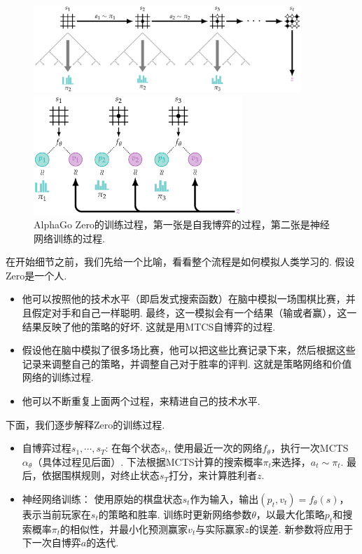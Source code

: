 \begin{figure}[ht]
\centering
\includegraphics[width=0.9\textwidth]{figures/game/self-play.pdf}
\vspace{1.5em}

\includegraphics[width=0.7\textwidth]{figures/game/network-training.pdf}
\caption{AlphaGo Zero的训练过程，第一张是自我博弈的过程，第二张是神经网络训练的过程. }
\label{fig:alphago-zero}
\end{figure}

在开始细节之前，我们先给一个比喻，看看整个流程是如何模拟人类学习的. 假设Zero是一个人. 
\begin{itemize}
    \item 他可以按照他的技术水平（即启发式搜索函数）在脑中模拟一场围棋比赛，并且假定对手和自己一样聪明. 最终，这一模拟会有一个结果（输或者赢），这一结果反映了他的策略的好坏. 这就是用MTCS自博弈的过程.
    \item 假设他在脑中模拟了很多场比赛，他可以把这些比赛记录下来，然后根据这些记录来调整自己的策略，并调整自己对于胜率的评判. 这就是策略网络和价值网络的训练过程.
    \item 他可以不断重复上面两个过程，来精进自己的技术水平. 
\end{itemize}

下面，我们逐步解释Zero的训练过程.

\begin{itemize}
    \item 自博弈过程$s_1,\cdots,s_T$: 在每个状态$s_t$, 使用最近一次的网络$f_\theta$，执行一次MCTS $\alpha_\theta$（具体过程见后面）. 下法根据MCTS计算的搜索概率$\pi_t$来选择，$a_t\sim\pi_t$. 最后，依据围棋规则，对终止状态$s_T$打分，来计算胜利者$z$. 
    \item 神经网络训练： 使用原始的棋盘状态$s_t$作为输入，输出$(p_t,v_t)=f_\theta(s)$，表示当前玩家在$s_t$的策略和胜率. 训练时更新网络参数$\theta$，以最大化策略$p_t$和搜索概率$\pi_t$的相似性，并最小化预测赢家$v_t$与实际赢家$z$的误差. 新参数将应用于下一次自博弈$a$的迭代.     
\end{itemize}

